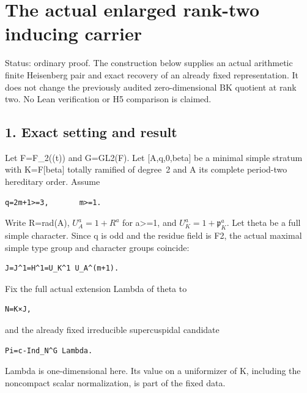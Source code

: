 \clearpage
\section{The actual enlarged rank-two inducing carrier}\label{app:rank~2}

Status: ordinary proof. The construction below supplies an actual
arithmetic finite Heisenberg pair and exact recovery of an already fixed
representation. It does not change the previously audited
zero-dimensional BK quotient at rank two. No Lean verification or H5
comparison is claimed.

\hypertarget{rank~2-exact-setting-and-result}{%
\subsection{1. Exact setting and
result}\label{rank~2-exact-setting-and-result}}

Let F=F\_2((t)) and G=GL2(F). Let {[}A,q,0,beta{]} be a minimal simple
stratum with K=F{[}beta{]} totally ramified of degree~2 and A its
complete period-two hereditary order. Assume

\begin{Verbatim}[fontsize=\small,breaklines=true,breakanywhere=true]
q=2m+1>=3,       m>=1.
\end{Verbatim}

Write R=rad(A), \(U_A^a=1+R^a\) for a\textgreater=1, and
\(U_K^a=1+\mathfrak p_K^a\). Let theta be a full simple character.
Since q is odd and the residue field is F2, the actual maximal simple
type group and character groups coincide:

\begin{Verbatim}[fontsize=\small,breaklines=true,breakanywhere=true]
J=J^1=H^1=U_K^1 U_A^(m+1).
\end{Verbatim}

Fix the full actual extension Lambda of theta to

\begin{Verbatim}[fontsize=\small,breaklines=true,breakanywhere=true]
N=K×J,
\end{Verbatim}

and the already fixed irreducible supercuspidal candidate

\begin{Verbatim}[fontsize=\small,breaklines=true,breakanywhere=true]
Pi=c-Ind_N^G Lambda.
\end{Verbatim}

Lambda is one-dimensional here. Its value on a uniformizer of K,
including the noncompact scalar normalization, is part of the fixed
data.

